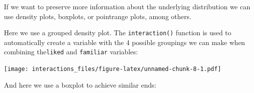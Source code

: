 \documentclass[]{article}
\newenvironment{Shaded}{\begin{snugshade}}{\end{snugshade}}
\newcommand{\KeywordTok}[1]{\textcolor[rgb]{0.13,0.29,0.53}{\textbf{#1}}}
\newcommand{\DataTypeTok}[1]{\textcolor[rgb]{0.13,0.29,0.53}{#1}}
\newcommand{\DecValTok}[1]{\textcolor[rgb]{0.00,0.00,0.81}{#1}}
\newcommand{\StringTok}[1]{\textcolor[rgb]{0.31,0.60,0.02}{#1}}
\newcommand{\OperatorTok}[1]{\textcolor[rgb]{0.81,0.36,0.00}{\textbf{#1}}}
\newcommand{\NormalTok}[1]{#1}
\theoremstyle{definition}
\theoremstyle{definition}
\theoremstyle{definition}
\theoremstyle{remark}
\begin{document}
If we want to preserve more information about the underlying
distribution we can use density plots, boxplots, or pointrange plots,
among others.

Here we use a grouped density plot. The \texttt{interaction()} function
is used to automatically create a variable with the 4 possible groupings
we can make when combining the\texttt{liked} and \texttt{familiar}
variables:

\begin{Shaded}
\end{Shaded}

\texttt{[image: interactions\_files/figure-latex/unnamed-chunk-8-1.pdf]}

And here we use a boxplot to achieve similar ends:

\begin{Shaded}
\end{Shaded}
\end{document}
